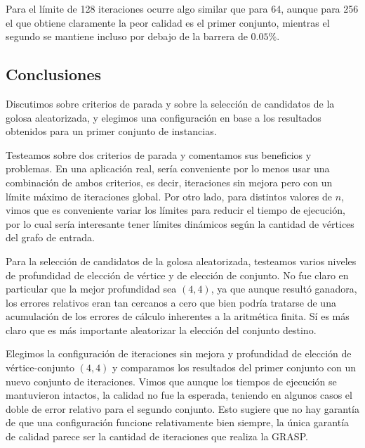 Para el límite de 128 iteraciones ocurre algo similar que para 64, aunque para 256 el que obtiene claramente la peor calidad es el primer conjunto, mientras el segundo se mantiene incluso por debajo de la barrera de $0.05\%$.

\subsection{Conclusiones}

Discutimos sobre criterios de parada y sobre la selección de candidatos de la golosa aleatorizada, y elegimos una configuración en base a los resultados obtenidos para un primer conjunto de instancias.

Testeamos sobre dos criterios de parada y comentamos sus beneficios y problemas. En una aplicación real, sería conveniente por lo menos usar una combinación de ambos criterios, es decir, iteraciones sin mejora pero con un límite máximo de iteraciones global. Por otro lado, para distintos valores de $n$, vimos que es conveniente variar los límites para reducir el tiempo de ejecución, por lo cual sería interesante tener límites dinámicos según la cantidad de vértices del grafo de entrada.

Para la selección de candidatos de la golosa aleatorizada, testeamos varios niveles de profundidad de elección de vértice y de elección de conjunto. No fue claro en particular que la mejor profundidad sea $(4,4)$, ya que aunque resultó ganadora, los errores relativos eran tan cercanos a cero que bien podría tratarse de una acumulación de los errores de cálculo inherentes a la aritmética finita. Sí es más claro que es más importante aleatorizar la elección del conjunto destino.

Elegimos la configuración de iteraciones sin mejora y profundidad de elección de vértice-conjunto $(4,4)$ y comparamos los resultados del primer conjunto con un nuevo conjunto de iteraciones. Vimos que aunque los tiempos de ejecución se mantuvieron intactos, la calidad no fue la esperada, teniendo en algunos casos el doble de error relativo para el segundo conjunto. Esto sugiere que no hay garantía de que una configuración funcione relativamente bien siempre, la única garantía de calidad parece ser la cantidad de iteraciones que realiza la GRASP.
